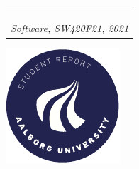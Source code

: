 \begin{titlepage}
{{\begin{tabular}{@{}p{\textwidth}@{}}
\begin{center}
{      }
    \end{center}
   \begin{center}
    {\large
      Andreas Kamp, Christian Houmann, Ivik Hostrup, John Nguyen, Patrick Østergaard, Rasmus Pyke%
    }\\
    \vspace{0.4cm}
    {\large
      \textit{Software, SW420F21, 2021}%
    }
  \end{center}
   \vspace{0.2cm}
  \end{tabular}}}
  \vfill
  \begin{center}
    \includegraphics[width=0.2\paperwidth]{AAUgraphics/aau_logo_circle_en}%
  \end{center}
\end{titlepage}
\clearpage
